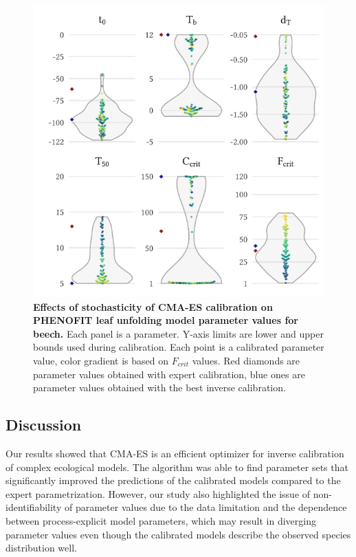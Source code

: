\clearpage

\begin{figure}[H]
\centering 
\includegraphics{chapter1/figs/unfoldingplots} 
\caption{\textbf{Effects of stochasticity of CMA-ES calibration on PHENOFIT leaf unfolding model parameter values for beech.} Each panel is a parameter. Y-axis limits are lower and upper bounds used during calibration. Each point is a calibrated parameter value, color gradient is based on $F_{crit}$ values. Red diamonds are parameter values obtained with expert calibration, blue ones are parameter values obtained with the best inverse calibration.}\label{fig:unfoldingplots}
\end{figure}

\subsection{Discussion}\label{discussion}

Our results showed that CMA-ES is an efficient optimizer for inverse
calibration of complex ecological models. The algorithm was able to find
parameter sets that significantly improved the predictions of the
calibrated models compared to the expert parametrization. However, our
study also highlighted the issue of non-identifiability of parameter
values due to the data limitation and the dependence between
process-explicit model parameters, which may result in diverging parameter
values even though the calibrated models describe the observed species
distribution well.

